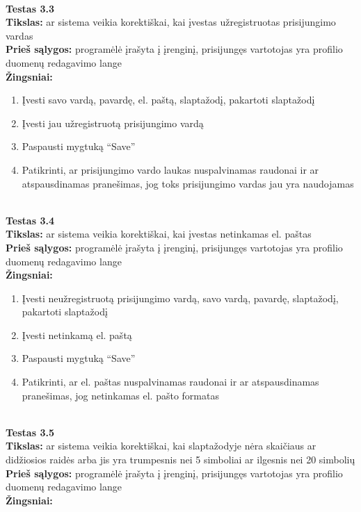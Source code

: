 \documentclass{VUMIFPSkursinis}
\begin{document}
		\textbf{}\\
		\textbf{Testas 3.3}\\
		\textbf{Tikslas:} ar sistema veikia korektiškai, kai įvestas užregistruotas prisijungimo vardas\\
		\textbf{Prieš sąlygos:} programėlė įrašyta į įrenginį, prisijungęs vartotojas yra profilio duomenų redagavimo lange\\
		\textbf{Žingsniai:}
		\begin{enumerate}[noitemsep,topsep=0pt]
			\item Įvesti savo vardą, pavardę, el. paštą, slaptažodį, pakartoti slaptažodį
			\item Įvesti jau užregistruotą prisijungimo vardą
			\item Paspausti mygtuką “Save” 
			\item Patikrinti, ar prisijungimo vardo laukas nuspalvinamas raudonai ir ar atspausdinamas pranešimas, jog toks prisijungimo vardas jau yra naudojamas
		\end{enumerate}
		\textbf{}\\
		\textbf{Testas 3.4}\\
		\textbf{Tikslas:} ar sistema veikia korektiškai, kai įvestas netinkamas el. paštas\\
		\textbf{Prieš sąlygos:} programėlė įrašyta į įrenginį, prisijungęs vartotojas yra profilio duomenų redagavimo lange\\
		\textbf{Žingsniai:}
		\begin{enumerate}[noitemsep,topsep=0pt]
			\item Įvesti neužregistruotą prisijungimo vardą, savo vardą, pavardę, slaptažodį, pakartoti slaptažodį
			\item Įvesti netinkamą el. paštą
			\item Paspausti mygtuką “Save” 
			\item Patikrinti, ar el. paštas nuspalvinamas raudonai ir ar atspausdinamas pranešimas, jog netinkamas el. pašto formatas
		\end{enumerate}
		\textbf{}\\
		\textbf{Testas 3.5}\\
		\textbf{Tikslas:} ar sistema veikia korektiškai, kai slaptažodyje nėra skaičiaus ar didžiosios raidės arba jis yra trumpesnis nei 5 simboliai ar ilgesnis nei 20 simbolių\\
		\textbf{Prieš sąlygos:} programėlė įrašyta į įrenginį, prisijungęs vartotojas yra profilio duomenų redagavimo lange\\
		\textbf{Žingsniai:}
\end{document}
